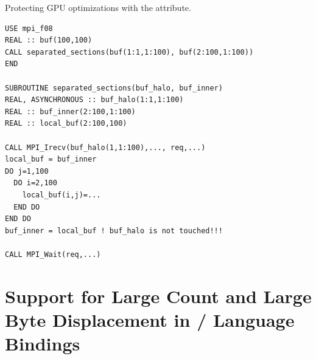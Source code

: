 \begin{example}
Protecting GPU optimizations with the  attribute.
\label{exa:lang:memory:modification:local-memory:separated}
%
%
\begin{lstlisting}[language={[MPI08]Fortran}]
USE mpi_f08
REAL :: buf(100,100)
CALL separated_sections(buf(1:1,1:100), buf(2:100,1:100))
END

SUBROUTINE separated_sections(buf_halo, buf_inner)
REAL, ASYNCHRONOUS :: buf_halo(1:1,1:100)
REAL :: buf_inner(2:100,1:100)
REAL :: local_buf(2:100,100)

CALL MPI_Irecv(buf_halo(1,1:100),..., req,...)
local_buf = buf_inner
DO j=1,100
  DO i=2,100
    local_buf(i,j)=...
  END DO
END DO
buf_inner = local_buf ! buf_halo is not touched!!!

CALL MPI_Wait(req,...)
\end{lstlisting}
\end{example}

%
%

\section[Support for Large Count and Large Byte Displacement]{Support for Large Count and Large Byte Displacement in \texorpdfstring{\MPI/}{MPI} Language Bindings}
\label{sec:largecount}

